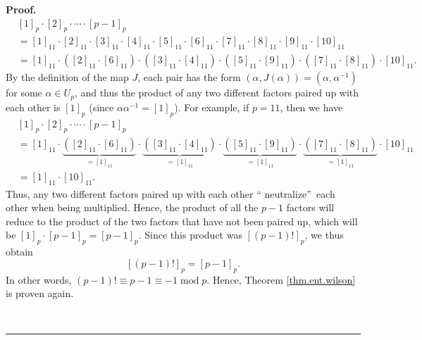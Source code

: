 \documentclass[numbers=enddot,12pt,final,onecolumn,notitlepage]{scrartcl}%
\numberwithin{exer}{subsection}
\theoremstyle{definition}
\newenvironment{proof}[1][Proof]{\noindent\textbf{#1.} }{\ \rule{0.5em}{0.5em}}
\begin{document}
\begin{proof}
\begin{align*}
&  \left[  1\right]  _{p}\cdot\left[  2\right]  _{p}\cdot\cdots\cdot\left[
p-1\right]  _{p}\\
&  =\left[  1\right]  _{11}\cdot\left[  2\right]  _{11}\cdot\left[  3\right]
_{11}\cdot\left[  4\right]  _{11}\cdot\left[  5\right]  _{11}\cdot\left[
6\right]  _{11}\cdot\left[  7\right]  _{11}\cdot\left[  8\right]  _{11}%
\cdot\left[  9\right]  _{11}\cdot\left[  10\right]  _{11}\\
&  =\left[  1\right]  _{11}\cdot\left(  \left[  2\right]  _{11}\cdot\left[
6\right]  _{11}\right)  \cdot\left(  \left[  3\right]  _{11}\cdot\left[
4\right]  _{11}\right)  \cdot\left(  \left[  5\right]  _{11}\cdot\left[
9\right]  _{11}\right)  \cdot\left(  \left[  7\right]  _{11}\cdot\left[
8\right]  _{11}\right)  \cdot\left[  10\right]  _{11}.
\end{align*}
By the definition of the map $J$, each pair has the form $\left(
\alpha,J\left(  \alpha\right)  \right)  =\left(  \alpha,\alpha^{-1}\right)  $
for some $\alpha\in U_{p}$, and thus the product of any two different factors
paired up with each other is $\left[  1\right]  _{p}$ (since $\alpha
\alpha^{-1}=\left[  1\right]  _{p}$). For example, if $p=11$, then we have%
\begin{align*}
&  \left[  1\right]  _{p}\cdot\left[  2\right]  _{p}\cdot\cdots\cdot\left[
p-1\right]  _{p}\\
&  =\left[  1\right]  _{11}\cdot\underbrace{\left(  \left[  2\right]
_{11}\cdot\left[  6\right]  _{11}\right)  }_{=\left[  1\right]  _{11}}%
\cdot\underbrace{\left(  \left[  3\right]  _{11}\cdot\left[  4\right]
_{11}\right)  }_{=\left[  1\right]  _{11}}\cdot\underbrace{\left(  \left[
5\right]  _{11}\cdot\left[  9\right]  _{11}\right)  }_{=\left[  1\right]
_{11}}\cdot\underbrace{\left(  \left[  7\right]  _{11}\cdot\left[  8\right]
_{11}\right)  }_{=\left[  1\right]  _{11}}\cdot\left[  10\right]  _{11}\\
&  =\left[  1\right]  _{11}\cdot\left[  10\right]  _{11}.
\end{align*}
Thus, any two different factors paired up with each other \textquotedblleft
neutralize\textquotedblright\ each other when being multiplied. Hence, the
product of all the $p-1$ factors will reduce to the product of the two factors
that have not been paired up, which will be $\left[  1\right]  _{p}%
\cdot\left[  p-1\right]  _{p}=\left[  p-1\right]  _{p}$. Since this product
was $\left[  \left(  p-1\right)  !\right]  _{p}$, we thus obtain
\begin{equation}
\left[  \left(  p-1\right)  !\right]  _{p}=\left[  p-1\right]  _{p}.
\label{pf.thm.ent.wilson.2nd.main-arg}%
\end{equation}
In other words, $\left(  p-1\right)  !\equiv p-1\equiv-1\operatorname{mod}p$.
Hence, Theorem \ref{thm.ent.wilson} is proven again.


\end{proof}
\end{document}
